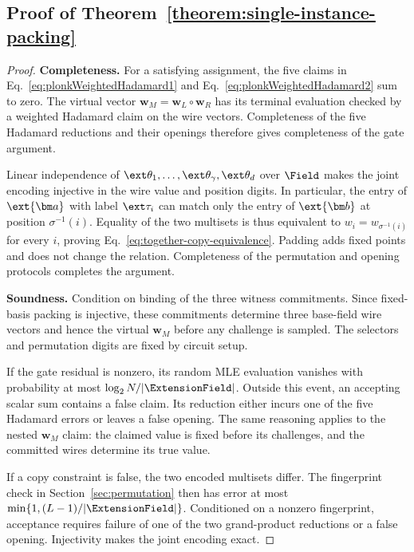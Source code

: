 \subsection{Proof of Theorem~\ref{theorem:single-instance-packing}}
\label{appx:proof-single-instance}

\begin{proof}
\noindent\textbf{Completeness.}
For a satisfying assignment, the five claims in
Eq.~\eqref{eq:plonkWeightedHadamard1} and
Eq.~\eqref{eq:plonkWeightedHadamard2} sum to zero.
The virtual vector \(\bm w_M=\bm w_L\circ\bm w_R\) has its
terminal evaluation checked by a weighted Hadamard claim on the
wire vectors. Completeness of the five Hadamard reductions and
their openings therefore gives completeness of the gate argument.

Linear independence of
\(\ext\theta_1,\ldots,\ext\theta_\gamma,\ext\theta_d\) over
\(\Field\) makes the joint encoding injective in the wire value
and position digits.
In particular, the entry of \(\ext{\bm a}\) with label
\(\ext\tau_i\) can match only the entry of \(\ext{\bm b}\)
at position \(\sigma^{-1}(i)\).
Equality of the two multisets is thus equivalent to
\(w_i=w_{\sigma^{-1}(i)}\) for every \(i\), proving
Eq.~\eqref{eq:together-copy-equivalence}.
Padding adds fixed points and does not change the relation.
Completeness of the permutation and opening protocols completes
the argument.

\smallskip\noindent\textbf{Soundness.}
Condition on binding of the three witness commitments.
Since fixed-basis packing is injective, these commitments determine
three base-field wire vectors and hence the virtual \(\bm w_M\)
before any challenge is sampled.
The selectors and permutation digits are fixed by circuit setup.

If the gate residual is nonzero, its random MLE evaluation
vanishes with probability at most \(\log_2N/|\ExtensionField|\).
Outside this event, an accepting scalar sum contains a false
claim. Its reduction either incurs one of the five Hadamard
errors or leaves a false opening. The same reasoning applies to
the nested \(\bm w_M\) claim: the claimed value is fixed before
its challenges, and the committed wires determine its true value.

If a copy constraint is false, the two encoded multisets differ.
The fingerprint check in Section~\ref{sec:permutation} then has
error at most \(\min\{1,(L-1)/|\ExtensionField|\}\).
Conditioned on a nonzero fingerprint, acceptance requires failure
of one of the two grand-product reductions or a false opening.
Injectivity makes the joint encoding exact.


\end{proof}
